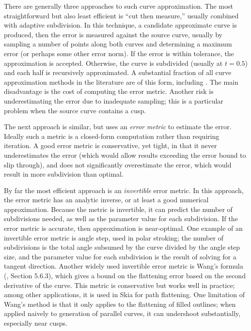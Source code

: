 \documentclass[sigconf, authordraft]{acmart}
\begin{document}
There are generally three approaches to such curve approximation. The most straightforward but also least efficient is ``cut then measure,'' usually combined with adaptive subdivision. In this technique, a candidate approximate curve is produced, then the error is measured against the source curve, usually by sampling a number of points along both curves and determining a maximum error (or perhaps some other error norm). If the error is within tolerance, the approximation is accepted. Otherwise, the curve is subdivided (usually at $t = 0.5$) and each half is recursively approximated. A substantial fraction of all curve approximation methods in the literature are of this form, including \cite{Nehab2020}. The main disadvantage is the cost of computing the error metric. Another risk is underestimating the error due to inadequate sampling; this is a particular problem when the source curve contains a cusp.


The next approach is similar, but uses an \emph{error metric} to estimate the error. Ideally such a metric is a closed-form computation rather than requiring iteration. A good error metric is conservative, yet tight, in that it never underestimates the error (which would allow results exceeding the error bound to slip through), and does not significantly overestimate the error, which would result in more subdivision than optimal.

By far the most efficient approach is an \emph{invertible} error metric. In this approach, the error metric has an analytic inverse, or at least a good numerical approximation. Because the metric is invertible, it can predict the number of subdivisions needed, as well as the parameter value for each subdivision. If the error metric is accurate, then approximation is near-optimal. One example of an invertible error metric is angle step, used in polar stroking\cite{Kilgard2020}; the number of subdivisions is the total angle subsumed by the curve divided by the angle step size, and the parameter value for each subdivision is the result of solving for a tangent direction. Another widely used invertible error metric is Wang's formula (\cite{Goldman2003}, Section 5.6.3), which gives a bound on the flattening error based on the second derivative of the curve. This metric is conservative but works well in practice; among other applications, it is used in Skia for path flattening. One limitation of Wang's method is that it only applies to the flattening of filled outlines; when applied naively to generation of parallel curves, it can undershoot substantially, especially near cusps.
\end{document}
